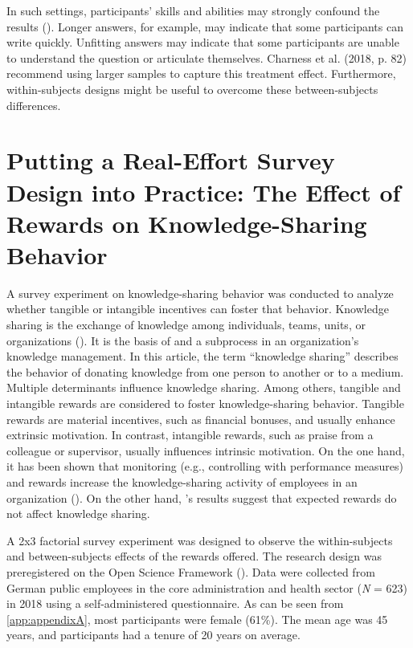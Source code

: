 \documentclass[twocolumn, serif, empirical, authordate]{jote-article}
\begin{document}
In such settings, participants' skills and abilities may strongly confound the results (). Longer answers, for example, may indicate that some participants can write quickly.
Unfitting answers may indicate that some participants are unable to understand the question or articulate themselves. Charness et al. (2018, p. 82) recommend using larger samples to capture this treatment effect.
Furthermore, within-subjects designs might be useful to overcome these between-subjects differences.


\section*{Putting a Real-Effort Survey Design into Practice: The Effect of Rewards on Knowledge-Sharing Behavior}
\label{sec:Putting a Real-Effort Survey Design into Practice: The Effect of Rewards on Knowledge-Sharing Behavior}

A survey experiment on knowledge-sharing behavior was conducted to analyze whether tangible or intangible incentives can foster that behavior. Knowledge sharing is the exchange of knowledge among individuals, teams, units, or organizations ().
It is the basis of and a subprocess in an organization's knowledge management. In this article, the term ``knowledge sharing'' describes the behavior of donating knowledge from one person to another or to a medium. Multiple determinants influence knowledge sharing. Among others, tangible and intangible rewards are considered to foster knowledge-sharing behavior. Tangible rewards are material incentives, such as financial bonuses, and usually enhance extrinsic motivation. In contrast, intangible rewards, such as praise from a colleague or supervisor, usually influences intrinsic motivation. On the one hand, it has been shown that monitoring (e.g., controlling with performance measures) and rewards increase the knowledge-sharing activity of employees in an organization (). On the other hand, \textcite{Bock2002}'s results suggest that expected rewards do not affect knowledge sharing.

A 2x3 factorial survey experiment was designed to observe the within-subjects and between-subjects effects of the rewards offered. The research design was preregistered on the Open Science Framework (). Data were collected from German public employees in the core administration and health sector (\emph{N} = 623) in 2018 using a self-administered questionnaire. As can be seen from \autoref{app:appendixA}, most participants were female (61\%). The mean age was 45 years, and participants had a tenure of 20 years on average.
\end{document}
